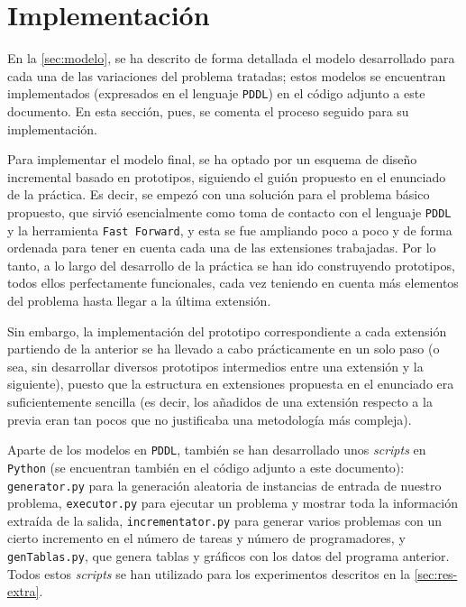 
\section{Implementación} \label{sec:implem}

En la \autoref{sec:modelo}, se ha descrito de forma detallada el modelo 
desarrollado para cada una de las variaciones del problema tratadas; estos 
modelos se encuentran implementados (expresados en el lenguaje \texttt{PDDL}) 
en el código adjunto a este documento. En esta sección, pues, se comenta el 
proceso seguido para su implementación. 

Para implementar el modelo final, se ha optado por un esquema de diseño 
incremental basado en prototipos, siguiendo el guión propuesto en el enunciado 
de la práctica. Es decir, se empezó con una solución para el problema básico 
propuesto, que sirvió esencialmente como toma de contacto con el lenguaje 
\texttt{PDDL} y la herramienta \texttt{Fast Forward}, y esta se fue ampliando 
poco a poco y de forma ordenada para tener en cuenta cada una de las 
extensiones trabajadas. Por lo tanto, a lo largo del desarrollo de la práctica 
se han ido construyendo prototipos, todos ellos perfectamente funcionales, 
cada vez teniendo en cuenta más elementos del problema hasta llegar a la 
última extensión. 

Sin embargo, la implementación del prototipo correspondiente a cada extensión 
partiendo de la anterior se ha llevado a cabo prácticamente en un solo paso 
(o sea, sin desarrollar diversos prototipos intermedios entre una extensión y 
la siguiente), puesto que la estructura en extensiones propuesta en el 
enunciado era suficientemente sencilla (es decir, los añadidos de una 
extensión respecto a la previa eran tan pocos que no justificaba una 
metodología más compleja).

Aparte de los modelos en \texttt{PDDL}, también se han desarrollado unos 
\textit{scripts} en \texttt{Python} (se encuentran también en el código adjunto 
a este documento): \texttt{generator.py} para la generación aleatoria de 
instancias de entrada de nuestro problema, \texttt{executor.py} para ejecutar 
un problema y mostrar toda la información extraída de la salida, 
\texttt{incrementator.py} para generar varios problemas con un cierto 
incremento en el número de tareas y número de programadores, y 
\texttt{genTablas.py}, que genera tablas y gráficos con los datos del programa
anterior. Todos estos \textit{scripts} se han utilizado para los experimentos 
descritos en la \autoref{sec:res-extra}. 


\clearpage

